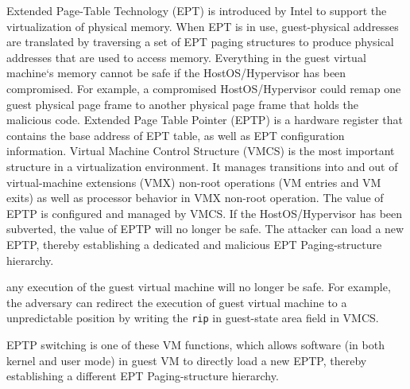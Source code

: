 \fi

\iffalse
In this paper, we introduce a novel scheme, named HyperPS, to implement hypervisor monitoring based on privilege separation without relying on any special hardware or reconstructing the hypervisor. The key idea of HyperPS is to separate the core virtualization privileges, especially the privileges of managing the physical memory, into an isolated execution environment alongside the HostOS kernel,
so that the security of virtual machines can be strongly protected, even if the HostOS/hypervisor has been compromised. Our isolated execution does not rely on a special hardware feature, nor demand a higher privilege level. Our isolated execution actually shares the same privilege level with the HostOS kernel. 
\fi
Extended Page-Table Technology (EPT) is introduced by Intel to support the virtualization of physical memory.
When EPT is in use, guest-physical addresses are translated by traversing a set of EPT paging structures to produce physical addresses that are used to access memory. Everything in the guest virtual machine`s memory cannot be safe if the HostOS/Hypervisor has been compromised. For example, a compromised HostOS/Hypervisor could remap one guest physical page frame to another physical page frame that holds the malicious code.
Extended Page Table Pointer (EPTP) is a hardware register that contains the base address of EPT table, as well as EPT configuration information. 
Virtual Machine Control Structure (VMCS) is the most important structure in a virtualization environment. It manages transitions into and out of virtual-machine extensions (VMX) non-root operations (VM entries and VM exits) as well as processor behavior in VMX non-root operation. 
The value of EPTP is configured and managed by VMCS. 
If the HostOS/Hypervisor has been subverted, the value of EPTP will no longer be safe. The attacker can load a new EPTP, thereby establishing a dedicated and malicious EPT Paging-structure hierarchy. 

\iffalse
any execution of the guest virtual machine will no longer be safe. 
For example, the adversary can redirect the execution of guest virtual machine to a unpredictable position by writing the \verb|rip| in guest-state area field in VMCS.

EPTP switching is one of these VM functions, which allows software (in both kernel and user mode) in guest VM to directly load a new EPTP, thereby establishing a different EPT Paging-structure hierarchy. 

